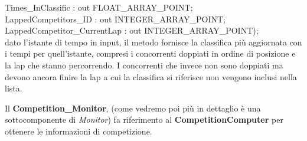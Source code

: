 \begin{itemize}
\begin{description}
{{Times\_InClassific : out FLOAT\_ARRAY\_POINT;\\ LappedCompetitors\_ID : out INTEGER\_ARRAY\_POINT;\\ LappedCompetitor\_CurrentLap : out INTEGER\_ARRAY\_POINT);}}\\
dato l'istante di tempo in input, il metodo fornisce la classifica pi\`{u} aggiornata con i tempi per quell'istante, compresi i concorrenti doppiati in ordine
di posizione e la lap che stanno percorrendo. I concorrenti che invece non sono doppiati ma devono ancora finire la lap a cui la classifica si
riferisce non vengono inclusi nella lista.
\end{description}
\end{itemize}
Il \textbf{Competition\_Monitor}, (come vedremo poi pi\`{u} in dettaglio \`{e} una sottocomponente di \emph{Monitor}) fa riferimento al \textbf{CompetitionComputer} per 
ottenere le informazioni di competizione.
\newpage

